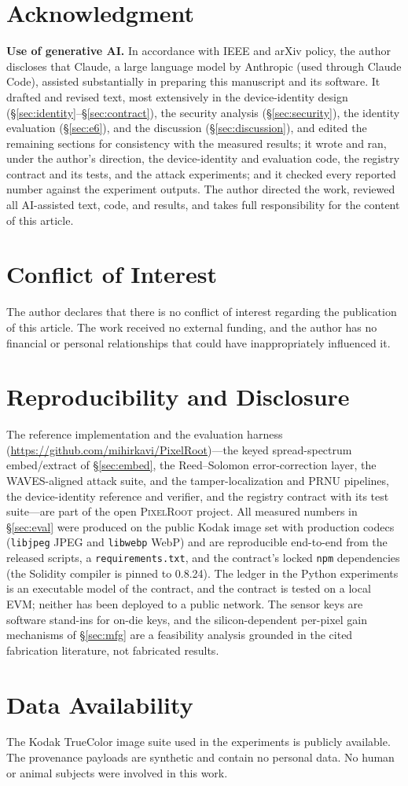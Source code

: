 \documentclass[journal]{IEEEtran}
\newcommand{\pr}{\textup{\textsc{PixelRoot}}}
\begin{document}
\section*{Acknowledgment}
\textbf{Use of generative AI.} In accordance with IEEE and arXiv policy, the
author discloses that Claude, a large language model by Anthropic (used through
Claude Code), assisted substantially in preparing this manuscript and its
software. It drafted and revised text, most extensively in the device-identity
design (\S\ref{sec:identity}--\S\ref{sec:contract}), the security analysis
(\S\ref{sec:security}), the identity evaluation (\S\ref{sec:e6}), and the
discussion (\S\ref{sec:discussion}), and edited the remaining sections for
consistency with the measured results; it wrote and ran, under the author's
direction, the device-identity and evaluation code, the registry contract and its
tests, and the attack experiments; and it checked every reported number against
the experiment outputs. The author directed the work, reviewed all AI-assisted
text, code, and results, and takes full responsibility for the content of this
article.

\section*{Conflict of Interest}
The author declares that there is no conflict of interest regarding the
publication of this article. The work received no external funding, and the
author has no financial or personal relationships that could have
inappropriately influenced it.

\section*{Reproducibility and Disclosure}
The reference implementation and the evaluation harness
(\url{https://github.com/mihirkavi/PixelRoot})---the keyed
spread-spectrum embed/extract of \S\ref{sec:embed}, the Reed--Solomon
error-correction layer, the WAVES-aligned attack suite, and the
tamper-localization and PRNU pipelines, the device-identity reference and
verifier, and the registry contract with its test suite---are part of the open
\pr{} project. All measured numbers in \S\ref{sec:eval} were produced on the
public Kodak image set with production codecs (\texttt{libjpeg} JPEG and
\texttt{libwebp} WebP) and are reproducible end-to-end from the released scripts,
a \texttt{requirements.txt}, and the contract's locked \texttt{npm} dependencies
(the Solidity compiler is pinned to 0.8.24). The ledger in the Python
experiments is an executable model of the contract, and the contract is tested
on a local EVM; neither has been deployed to a public network. The sensor keys
are software stand-ins for on-die keys, and the silicon-dependent per-pixel gain
mechanisms of \S\ref{sec:mfg} are a feasibility analysis grounded in the cited
fabrication literature, not fabricated results.

\section*{Data Availability}
The Kodak True\-Color image suite used in the experiments is publicly available.
The provenance payloads are synthetic and contain no personal data. No human or
animal subjects were involved in this work.



\end{document}
